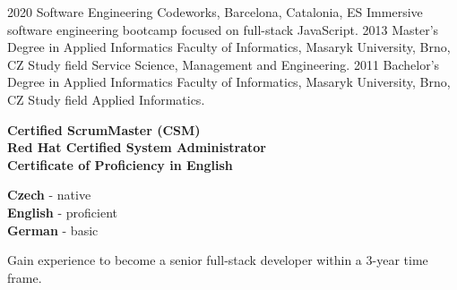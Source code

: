 \documentclass[9pt]{developercv}
\begin{document}

\begin{entrylist}
  \entry
  {2020}
  {Software Engineering}
  {Codeworks, Barcelona, Catalonia, ES}
  {Immersive software engineering bootcamp focused on full-stack JavaScript.}
  \entry
  {2013}
  {Master's Degree in Applied Informatics}
  {Faculty of Informatics, Masaryk University, Brno, CZ}
  {Study field Service Science, Management and Engineering.}
  \entry
  {2011}
  {Bachelor's Degree  in Applied Informatics}
  {Faculty of Informatics, Masaryk University, Brno, CZ}
  {Study field Applied Informatics.}
\end{entrylist}

\begin{minipage}[t]{0.35\textwidth}
  \vspace{-\baselineskip}


  \textbf{Certified ScrumMaster (CSM)}\\
  \textbf{Red Hat Certified System Administrator}\\
  \textbf{Certificate of Proficiency in English}
\end{minipage}
\hfill
\begin{minipage}[t]{0.2\textwidth}
  \vspace{-\baselineskip}


  \textbf{Czech} - native\\
  \textbf{English} - proficient\\
  \textbf{German} - basic
\end{minipage}
\hfill
\begin{minipage}[t]{0.25\textwidth}
  \vspace{-\baselineskip}


  Gain experience to become a senior full-stack developer within a 3-year time frame.
\end{minipage}
\end{document}
